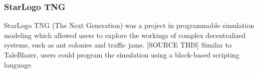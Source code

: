 \subsubsection{StarLogo TNG}

StarLogo TNG (The Next Generation) was a project in programmable simulation modeling which allowed users to explore the workings of complex decentralized systems, such as ant colonies and traffic jams. [SOURCE THIS] Similar to TaleBlazer, users could program the simulation using a block-based scripting language. 










